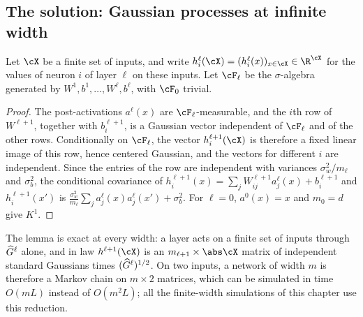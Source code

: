 \begin{refsection}
\section{The solution: Gaussian processes at infinite width}\label{sec:signalprop:gp}

Let $\cX$ be a finite set of inputs, and write $h^\ell_i(\cX)=(h^\ell_i(x))_{x\in\cX}\in\R^{\cX}$ for the values of neuron $i$ of layer $\ell$ on these inputs. Let $\cF_\ell$ be the $\sigma$-algebra generated by $W^1,b^1,\dots,W^\ell,b^\ell$, with $\cF_0$ trivial.


\begin{proof}
The post-activations $a^\ell(x)$ are $\cF_\ell$-measurable, and the $i$th row of $W^{\ell+1}$, together with $b^{\ell+1}_i$, is a Gaussian vector independent of $\cF_\ell$ and of the other rows. Conditionally on $\cF_\ell$, the vector $h^{\ell+1}_i(\cX)$ is therefore a fixed linear image of this row, hence centered Gaussian, and the vectors for different $i$ are independent. Since the entries of the row are independent with variances $\sigma_w^2/m_\ell$ and $\sigma_b^2$, the conditional covariance of $h^{\ell+1}_i(x)=\sum_jW^{\ell+1}_{ij}a^\ell_j(x)+b^{\ell+1}_i$ and $h^{\ell+1}_i(x')$ is $\frac{\sigma_w^2}{m_\ell}\sum_ja^\ell_j(x)a^\ell_j(x')+\sigma_b^2$. For $\ell=0$, $a^0(x)=x$ and $m_0=d$ give $K^1$.
\end{proof}

The lemma is exact at every width: a layer acts on a finite set of inputs through $\widehat{G}^\ell$ alone, and in law $h^{\ell+1}(\cX)$ is an $m_{\ell+1}\times\abs\cX$ matrix of independent standard Gaussians times $(\widehat{G}^\ell)^{1/2}$. On two inputs, a network of width $m$ is therefore a Markov chain on $m\times2$ matrices, which can be simulated in time $O(mL)$ instead of $O(m^2L)$; all the finite-width simulations of this chapter use this reduction.


\end{refsection}
